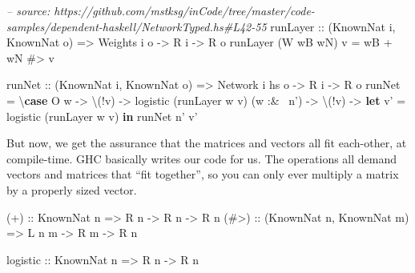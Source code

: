 \documentclass[]{article}
\newenvironment{Shaded}{\begin{snugshade}}{\end{snugshade}}
\newcommand{\CommentTok}[1]{\textcolor[rgb]{0.56,0.35,0.01}{\textit{#1}}}
\newcommand{\DataTypeTok}[1]{\textcolor[rgb]{0.13,0.29,0.53}{#1}}
\newcommand{\FunctionTok}[1]{\textcolor[rgb]{0.00,0.00,0.00}{#1}}
\newcommand{\KeywordTok}[1]{\textcolor[rgb]{0.13,0.29,0.53}{\textbf{#1}}}
\newcommand{\NormalTok}[1]{#1}
\newcommand{\OtherTok}[1]{\textcolor[rgb]{0.56,0.35,0.01}{#1}}
\begin{document}
\begin{Shaded}
\begin{Highlighting}[]
\CommentTok{-- source: https://github.com/mstksg/inCode/tree/master/code-samples/dependent-haskell/NetworkTyped.hs#L42-55}
\OtherTok{runLayer ::}\NormalTok{ (}\DataTypeTok{KnownNat}\NormalTok{ i, }\DataTypeTok{KnownNat}\NormalTok{ o)}
         \OtherTok{=>} \DataTypeTok{Weights}\NormalTok{ i o}
         \OtherTok{->} \DataTypeTok{R}\NormalTok{ i}
         \OtherTok{->} \DataTypeTok{R}\NormalTok{ o}
\NormalTok{runLayer (}\DataTypeTok{W}\NormalTok{ wB wN) v }\FunctionTok{=}\NormalTok{ wB }\FunctionTok{+}\NormalTok{ wN }\FunctionTok{#>}\NormalTok{ v}

\OtherTok{runNet ::}\NormalTok{ (}\DataTypeTok{KnownNat}\NormalTok{ i, }\DataTypeTok{KnownNat}\NormalTok{ o)}
       \OtherTok{=>} \DataTypeTok{Network}\NormalTok{ i hs o}
       \OtherTok{->} \DataTypeTok{R}\NormalTok{ i}
       \OtherTok{->} \DataTypeTok{R}\NormalTok{ o}
\NormalTok{runNet }\FunctionTok{=}\NormalTok{ \textbackslash{}}\KeywordTok{case}
   \DataTypeTok{O}\NormalTok{ w }\OtherTok{->}\NormalTok{ \textbackslash{}(}\FunctionTok{!}\NormalTok{v) }\OtherTok{->}\NormalTok{ logistic (runLayer w v)}
\NormalTok{   (w }\FunctionTok{:&~}\NormalTok{ n') }\OtherTok{->}\NormalTok{ \textbackslash{}(}\FunctionTok{!}\NormalTok{v) }\OtherTok{->} \KeywordTok{let}\NormalTok{ v' }\FunctionTok{=}\NormalTok{ logistic (runLayer w v)}
                          \KeywordTok{in}\NormalTok{ runNet n' v'}
\end{Highlighting}
\end{Shaded}

But now, we get the assurance that the matrices and vectors all fit each-other,
at compile-time. GHC basically writes our code for us. The operations all demand
vectors and matrices that ``fit together'', so you can only ever multiply a
matrix by a properly sized vector.

\begin{Shaded}
\begin{Highlighting}[]
\OtherTok{(+)  ::} \DataTypeTok{KnownNat}\NormalTok{ n}
     \OtherTok{=>} \DataTypeTok{R}\NormalTok{ n }\OtherTok{->} \DataTypeTok{R}\NormalTok{ n }\OtherTok{->} \DataTypeTok{R}\NormalTok{ n}
\OtherTok{(#>) ::}\NormalTok{ (}\DataTypeTok{KnownNat}\NormalTok{ n, }\DataTypeTok{KnownNat}\NormalTok{ m)}
     \OtherTok{=>} \DataTypeTok{L}\NormalTok{ n m }\OtherTok{->} \DataTypeTok{R}\NormalTok{ m }\OtherTok{->} \DataTypeTok{R}\NormalTok{ n}

\OtherTok{logistic ::} \DataTypeTok{KnownNat}\NormalTok{ n}
         \OtherTok{=>} \DataTypeTok{R}\NormalTok{ n }\OtherTok{->} \DataTypeTok{R}\NormalTok{ n}
\end{Highlighting}
\end{Shaded}
\end{document}
